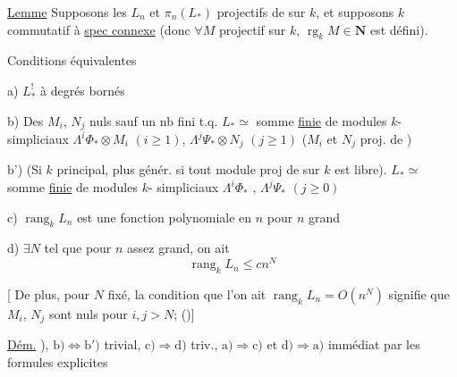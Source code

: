 \uline{Lemme} Supposons les $L_n$ et $\pi_n(L_*)$
projectifs de  sur $k$, et supposons $k$
commutatif à \uline{spec connexe} (donc
$\forall M$ projectif sur $k$, $\operatorname{rg}_k M\in\mathbf N$ est défini).

Conditions équivalentes

a) $L^!_*$ à degrés bornés

b)  Des $M_i$, $N_j$  nuls sauf
un nb fini t.q. $L_*\simeq$ somme \uline{finie}
de modules $k$-simpliciaux $\Lambda^i\Phi_*\otimes M_i$ $(i\geq1)$,
$\Lambda^j\Psi_*\otimes N_j$ $(j\geq1)$ ($M_i$ et $N_j$ proj. de )

b') (Si $k$ principal, plus génér. si tout
module proj de  sur $k$ est libre).
$L_*\simeq$ somme \uline{finie} de modules $k$-
simpliciaux $\Lambda^i\Phi_*$ , $\Lambda^j\Psi_*$ $(j\geq0)$

c) $\operatorname{rang}_k L_n$ est une fonction
polynomiale en $n$ pour $n$ grand

d) $\exists N$  tel que pour $n$ assez
grand, on ait
\[
\operatorname{rang}_k L_n\leq c n^N
\]

[ De plus,  pour $N$ fixé, la condition
que l'on ait $\operatorname{rang}_k L_n=O(n^N)$
signifie que $M_i$, $N_j$ sont nuls pour $i,j>N$;
 
()]

\uline{Dém.} 
), $\mathrm b)\Longleftrightarrow\mathrm b')$ trivial,
$\mathrm c)\Rightarrow\mathrm d)$ triv., $\mathrm a)\Rightarrow\mathrm c)$ et $\mathrm d)\Rightarrow\mathrm a)$
immédiat par les formules explicites
